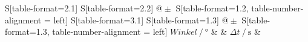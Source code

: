 \begin{table}
    \centering
    \caption{Messdaten.}
    \label{tab:Winkel}
    \begin{tabular}{
	S[table-format=2.1]
	S[table-format=2.2]
	@{${}\pm{}$}
	S[table-format=1.2, table-number-alignment = left]
	S[table-format=3.1]
	S[table-format=1.3]
	@{${}\pm{}$}
	S[table-format=1.3, table-number-alignment = left]
	}
	\toprule
	{$Winkel \:/\: \si{\degree}$}		& 		& 
	{$\Delta t \:/\: \si{\second}$}		& 		\\ 
	\midrule
    
    \bottomrule
    \end{tabular}
    \end{table}
